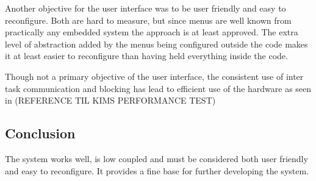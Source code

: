 Another objective for the user interface was to be user friendly and easy to reconfigure. Both are hard to measure, but since menus are well known from practically any embedded system the approach is at least approved. The extra level of abstraction added by the menus being configured outside the code makes it at least easier to reconfigure than having held everything inside the code.

Though not a primary objective of the user interface, the consistent use of inter task communication and blocking has lead to efficient use of the hardware as seen in (REFERENCE TIL KIMS PERFORMANCE TEST)

\subsection{Conclusion}
The system works well, is low coupled and must be considered both user friendly and easy to reconfigure. It provides a fine base for further developing the system.
